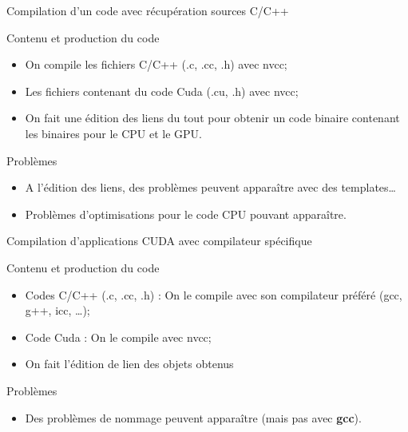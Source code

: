\documentclass[handout,francais]{beamer}
\begin{document}
\begin{frame}{Compilation d'un code avec récupération sources C/C++}
  \begin{exampleblock}{Contenu et production du code}
    \begin{itemize}
    \item On compile les fichiers C/C++ (.c, .cc, .h)  avec nvcc;
    \item Les fichiers contenant du code Cuda (.cu, .h) avec nvcc;
    \item On fait une édition des liens du tout pour obtenir un code binaire
      contenant les binaires pour le CPU et le GPU.
    \end{itemize}
  \end{exampleblock}

  \begin{alertblock}{Problèmes}
    \begin{itemize}
  \item A l'édition des liens, des problèmes peuvent apparaître avec des templates\ldots
  \item Problèmes d'optimisations pour le code CPU pouvant apparaître.
    \end{itemize}
  \end{alertblock}
\end{frame}

\begin{frame}{Compilation d'applications CUDA avec compilateur spécifique}

  \begin{exampleblock}{Contenu et production du code}
    \begin{itemize}
    \item Codes  C/C++ (.c, .cc, .h) : On le compile avec son
      compilateur préféré (gcc, g++, icc, \ldots);
    \item Code Cuda : On le compile avec nvcc;
    \item On fait l'édition de lien des objets obtenus
    \end{itemize}
  \end{exampleblock}

  \begin{alertblock}{Problèmes}
    \begin{itemize}
    \item Des problèmes de nommage peuvent apparaître (mais pas avec
      \textbf{gcc}).
    \end{itemize}
  \end{alertblock}
\end{frame}
\end{document}
